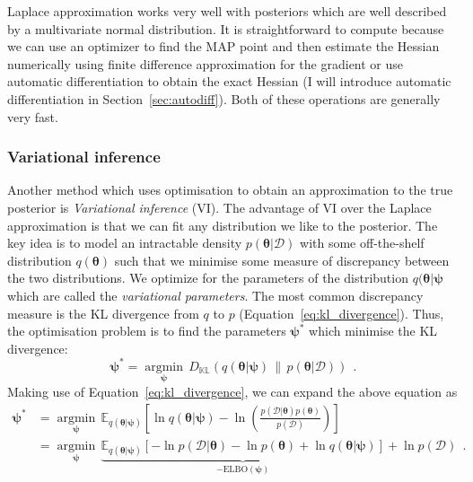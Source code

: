 \documentclass[12pt,dvipsnames]{report}
\renewcommand{\vec}[1]{\boldsymbol{\mathbf{#1}}}
\newcommand{\hquad}{~~}
\begin{document}
Laplace approximation works very well with posteriors which are well described
by a multivariate normal distribution. It is straightforward to compute because
we can use an optimizer to find the MAP point and then estimate the Hessian
numerically using finite difference approximation for the gradient or use
automatic differentiation to obtain the exact Hessian (I will introduce automatic
differentiation in Section~\ref{sec:autodiff}). Both of these operations are generally 
very fast.

\subsubsection{Variational inference}
Another method which uses optimisation to obtain an approximation to the true
posterior is \emph{Variational inference} (VI). The advantage of VI over the
Laplace approximation is that we can fit any distribution we like to the
posterior. The key idea is to model an intractable density $p(\vec{\theta}
    \lvert\mathcal{D})$ with some off-the-shelf distribution $q(\vec{\theta})$ such
that we minimise some measure of discrepancy between the two distributions.
We optimize for the parameters of the distribution $q(\vec{\theta}|\vec{\psi}$ which are 
called the \emph{variational parameters}. The most
common discrepancy measure is the KL divergence
from $q$ to $p$ (Equation~\ref{eq:kl_divergence}). 
Thus, the optimisation
problem is to find the parameters $\vec{\psi}^*$ which minimise the KL
divergence:
\begin{equation}
    \boldsymbol{\psi}^{*}=\underset{\boldsymbol{\psi}}{\operatorname{argmin}}\,D_{\mathbb{K} \mathbb{L}}(q(\boldsymbol{\theta} \lvert\boldsymbol{\psi})\, \|\, p(\boldsymbol{\theta} \lvert\mathcal{D}))
    \hquad.
    \label{eq:variational_inference}
\end{equation}
Making use of Equation~\ref{eq:kl_divergence}, we can expand the above equation as \citep{murphy_book_2022}
\begin{align}
    \vec{\psi}^* & =\underset{\vec{\psi}}{\operatorname{argmin}}\, \mathbb{E}_{q(\boldsymbol{\theta} \lvert\boldsymbol{\psi})}\left[\ln q(\boldsymbol{\theta} \lvert\boldsymbol{\psi})-\ln \left(\frac{p(\mathcal{D} \lvert\boldsymbol{\theta}) p(\boldsymbol{\theta})}{p(\mathcal{D})}\right)\right]                           \\
                 & =\underset{\vec{\psi}}{\operatorname{argmin}} \,\underbrace{\mathbb{E}_{q(\boldsymbol{\theta} \lvert\boldsymbol{\psi})}[-\ln p(\mathcal{D} \lvert\boldsymbol{\theta})-\ln p(\boldsymbol{\theta})+\ln q(\boldsymbol{\theta} \lvert\boldsymbol{\psi})]}_{-\mathrm{ELBO}(\boldsymbol{\psi})}+\ln p(\mathcal{D})
                 \hquad.
\end{align}
\end{document}
